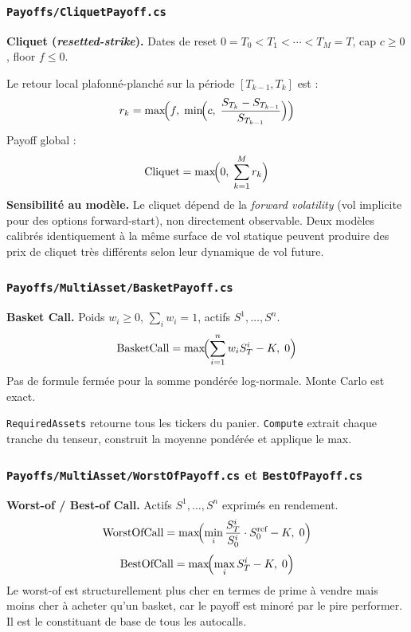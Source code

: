 \documentclass[a4paper,11pt]{article}
\newcommand{\cs}[1]{\texttt{\color{codeinline}#1}}
\begin{document}
\subsubsection{\texttt{Payoffs/CliquetPayoff.cs}}

\begin{tcolorbox}[math]
\textbf{Cliquet (\textit{resetted-strike}).} Dates de reset $0 = T_0 < T_1 < \cdots < T_M = T$,
cap $c \ge 0$, floor $f \le 0$.

Le retour local plafonn\'e-planch\'e sur la p\'eriode $[T_{k-1}, T_k]$ est :
\[
  r_k = \max\!\Bigl(f,\;\min\!\Bigl(c,\; \frac{S_{T_k} - S_{T_{k-1}}}{S_{T_{k-1}}}\Bigr)\Bigr)
\]
Payoff global :
\[
  \text{Cliquet} = \max\!\Bigl(0,\; \sum_{k=1}^M r_k\Bigr)
\]
\textbf{Sensibilit\'e au mod\`ele.} Le cliquet d\'epend de la \textit{forward volatility}
(vol implicite pour des options forward-start), non directement observable. Deux mod\`eles
calibr\'es identiquement \`a la m\^eme surface de vol statique peuvent produire des prix
de cliquet tr\`es diff\'erents selon leur dynamique de vol future.
\end{tcolorbox}

\subsubsection{\texttt{Payoffs/MultiAsset/BasketPayoff.cs}}

\begin{tcolorbox}[math]
\textbf{Basket Call.} Poids $w_i \ge 0$, $\sum_i w_i = 1$, actifs $S^1, \dots, S^n$.
\[
  \text{BasketCall} = \max\!\Bigl(\sum_{i=1}^n w_i S^i_T - K,\; 0\Bigr)
\]
Pas de formule ferm\'ee pour la somme pond\'er\'ee log-normale. Monte Carlo est exact.
\end{tcolorbox}

\cs{RequiredAssets} retourne tous les tickers du panier. \cs{Compute} extrait chaque
tranche du tenseur, construit la moyenne pond\'er\'ee et applique le max.

\subsubsection{\texttt{Payoffs/MultiAsset/WorstOfPayoff.cs} et \texttt{BestOfPayoff.cs}}

\begin{tcolorbox}[math]
\textbf{Worst-of / Best-of Call.} Actifs $S^1, \dots, S^n$ exprim\'es en rendement.
\[
  \text{WorstOfCall} = \max\!\Bigl(\min_{i} \frac{S^i_T}{S^i_0} \cdot S^{\text{ref}}_0 - K,\; 0\Bigr)
\]
\[
  \text{BestOfCall} = \max\!\Bigl(\max_{i} S^i_T - K,\; 0\Bigr)
\]
Le worst-of est structurellement plus cher en termes de prime \`a vendre mais moins
cher \`a acheter qu'un basket, car le payoff est minor\'e par le pire performer. Il est
le constituant de base de tous les autocalls.
\end{tcolorbox}
\end{document}
